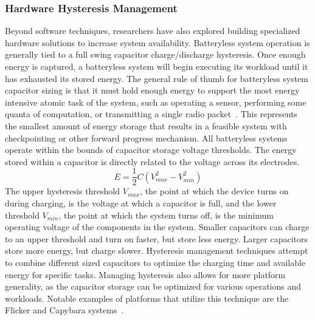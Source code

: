 \subsubsection{Hardware Hysteresis Management}
\label{sec:background:hhm}
Beyond software techniques, researchers have also explored building specialized hardware solutions to increase system availability.
Batteryless system operation is generally tied to a full swing capacitor charge/discharge hysteresis. Once enough energy is captured, a batteryless system will begin executing its workload until it has exhausted its stored energy.
The general rule of thumb for batteryless system capacitor sizing is that it must hold enough energy to support the most energy intensive atomic task of the system, such as operating a sensor, performing some quanta of computation, or transmitting a single radio packet~\cite{nardello2019camaroptera,colinReconfigurable18, shukla2019skinnypower, hesterFlicker17}.
This represents the smallest amount of energy storage that results in a feasible system with checkpointing or other forward progress mechanism.
All batteryless systems operate within the bounds of capacitor storage voltage thresholds.
The energy stored within a capacitor is directly related to the voltage across its electrodes.
\begin{equation}
\label{eq:cap_energy}
    E = \frac{1}{2}C(V_{max}^2 - V_{min}^2)
\end{equation}
The upper hysteresis threshold $V_{max}$, the point at which the device turns on during charging, is the voltage at which a capacitor is full, and the lower threshold $V_{min}$, the point at which the system turns off, is the minimum
operating voltage of the components in the system.
Smaller capacitors can charge to an upper
threshold and turn on faster, but store less energy.  Larger capacitors store more energy, but charge slower.
Hysteresis management
techniques attempt to combine different sized capacitors to
optimize the charging time and available energy for specific tasks.
Managing hysteresis also allows for more platform generality, as the capacitor storage can be optimized for various operations and workloads.
Notable examples of platforms that utilize this technique are the Flicker and Capybara systems~\cite{hesterFlicker17, colinReconfigurable18}.

